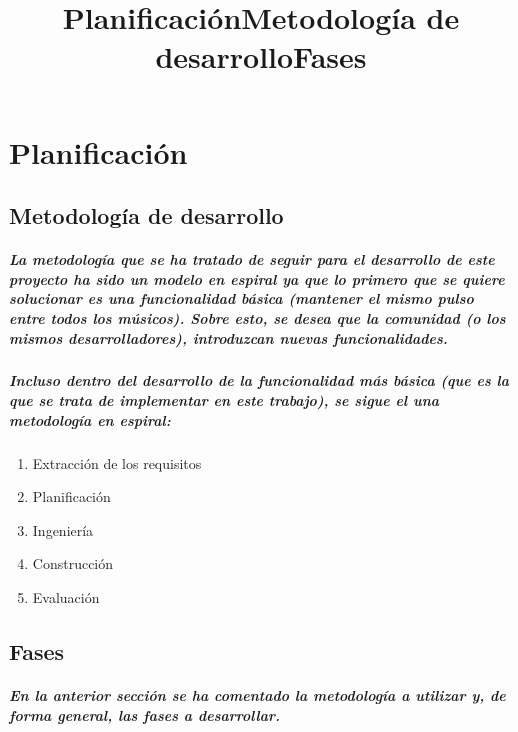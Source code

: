 \chapter{Planificación}
\title{Planificación}

\title{Metodología de desarrollo}
\section{Metodología de desarrollo}

\paragraph{
La metodología que se ha tratado de seguir para el desarrollo de este proyecto ha sido
un modelo en espiral ya que lo primero que se quiere solucionar es una funcionalidad
básica (mantener el mismo pulso entre todos los músicos). Sobre esto,
se desea que la comunidad (o los mismos desarrolladores), introduzcan nuevas
funcionalidades.
}

\paragraph{
Incluso dentro del desarrollo de la funcionalidad más básica (que es
la que se trata de implementar en este trabajo), se sigue el una metodología en espiral:
}

\begin{enumerate}
  \item Extracción de los requisitos
  \item Planificación
  \item Ingeniería
  \item Construcción
  \item Evaluación
\end{enumerate}

\title{Fases}
\section{Fases}
\paragraph{
En la anterior sección se ha comentado la metodología a utilizar y, de forma general,
las fases a desarrollar.
}

